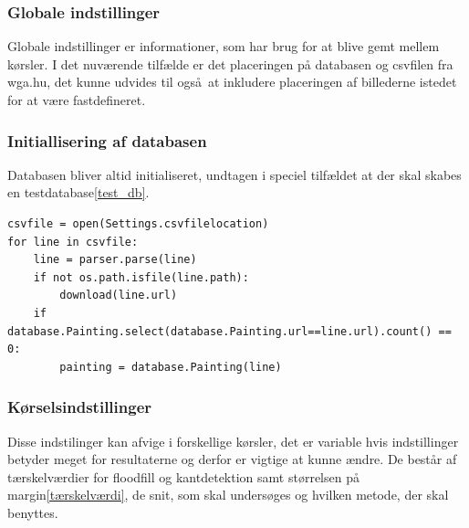 {\subsubsection{Globale indstillinger}
Globale indstillinger er informationer, som har brug for at blive gemt
mellem kørsler. I det nuværende tilfælde er det placeringen på databasen og
csvfilen fra wga.hu, det kunne udvides til også at inkludere placeringen
af billederne istedet for at være fastdefineret.
\subsubsection{Initiallisering af databasen}
Databasen bliver altid initialiseret, undtagen i speciel tilfældet at
der skal skabes en testdatabase\ref{test_db}. 
\begin{lstlisting}[caption={Pseudokode for database
initialisering},frame=tb,label={pseudo_init_db}]
csvfile = open(Settings.csvfilelocation)
for line in csvfile:
	line = parser.parse(line)
	if not os.path.isfile(line.path):
		download(line.url)
	if database.Painting.select(database.Painting.url==line.url).count() == 0:
		painting = database.Painting(line)
\end{lstlisting}
\label{test_db}
\subsubsection{Kørselsindstillinger}
Disse indstilinger kan afvige i forskellige kørsler, det er variable
hvis indstillinger betyder meget for resultaterne og derfor er vigtige
at kunne ændre. De består af tærskelværdier for floodfill og
kantdetektion samt størrelsen på margin\ref{tærskelværdi}, de snit, som
skal undersøges og hvilken metode, der skal benyttes.
}
